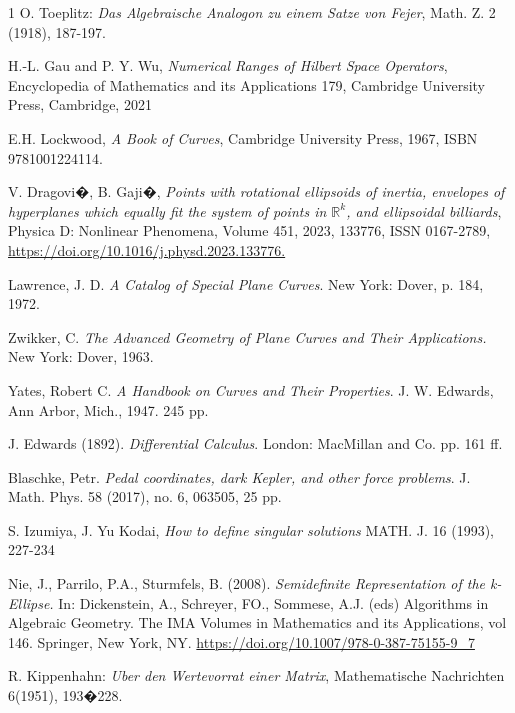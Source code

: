 \documentclass[10pt,a4paper,reqno]{amsart}
\begin{document}
\begin{thebibliography}{1}
 O. Toeplitz: \textit{Das Algebraische Analogon zu einem Satze von Fejer}, Math. Z. 2 (1918), 187-197.

H.-L. Gau and P. Y. Wu,\textit{ Numerical Ranges of Hilbert Space Operators}, Encyclopedia of Mathematics and its Applications 179, Cambridge University Press, Cambridge, 2021

 E.H. Lockwood, \textit{A Book of Curves}, Cambridge University Press, 1967, ISBN 9781001224114.


 V. Dragovi�, B. Gaji�,
\textit{Points with rotational ellipsoids of inertia, envelopes of hyperplanes which equally fit the system of points in $\mathbb{R}^k$, and ellipsoidal billiards},
Physica D: Nonlinear Phenomena,
Volume 451,
2023,
133776,
ISSN 0167-2789,
\url{https://doi.org/10.1016/j.physd.2023.133776.}



Lawrence, J. D. \textit{A Catalog of Special Plane Curves}. New York: Dover, p. 184, 1972.

 Zwikker, C. \emph{The Advanced Geometry of Plane Curves and Their Applications.} New York: Dover, 1963.


 Yates, Robert C. \emph{A Handbook on Curves and Their Properties}. J. W. Edwards, Ann Arbor, Mich., 1947. 245 pp.

 J. Edwards (1892). \emph{Differential Calculus}. London: MacMillan and Co. pp. 161 ff.

 Blaschke, Petr. \emph{Pedal coordinates, dark Kepler, and other force problems}. J. Math. Phys. 58 (2017), no. 6, 063505, 25 pp.

 S. Izumiya, J. Yu
Kodai, \emph{How to define singular solutions}
 MATH. J.
16 (1993), 227-234



Nie, J., Parrilo, P.A., Sturmfels, B. (2008). \textit{Semidefinite Representation of the k-Ellipse.} In: Dickenstein, A., Schreyer, FO., Sommese, A.J. (eds) Algorithms in Algebraic Geometry. The IMA Volumes in Mathematics and its Applications, vol 146. Springer, New York, NY. \url{https://doi.org/10.1007/978-0-387-75155-9\_7}

R. Kippenhahn: \textit{Uber den Wertevorrat
einer Matrix}, Mathematische Nachrichten 6(1951), 193�228.


\end{thebibliography}
\end{document}
